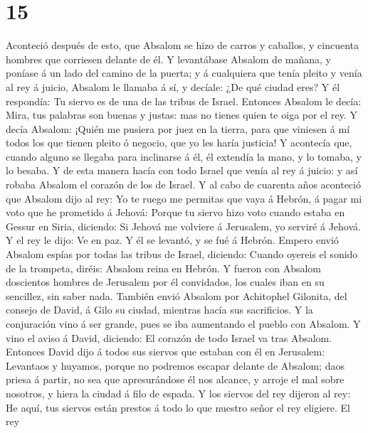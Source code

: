 \hypertarget{section-14}{%
\section{15}\label{section-14}}

 Aconteció después de esto, que Absalom se hizo de carros
y caballos, y cincuenta hombres que corriesen delante de él.
 Y levantábase Absalom de mañana, y poníase á un lado del
camino de la puerta; y á cualquiera que tenía pleito y venía al rey á
juicio, Absalom le llamaba á sí, y decíale: ¿De qué ciudad eres? Y él
respondía: Tu siervo es de una de las tribus de Israel. 
Entonces Absalom le decía: Mira, tus palabras son buenas y justas: mas
no tienes quien te oiga por el rey.  Y decía Absalom:
¡Quién me pusiera por juez en la tierra, para que viniesen á mí todos
los que tienen pleito ó negocio, que yo les haría justicia!
 Y acontecía que, cuando alguno se llegaba para inclinarse
á él, él extendía la mano, y lo tomaba, y lo besaba.  Y de
esta manera hacía con todo Israel que venía al rey á juicio: y así
robaba Absalom el corazón de los de Israel.  Y al cabo de
cuarenta años aconteció que Absalom dijo al rey: Yo te ruego me permitas
que vaya á Hebrón, á pagar mi voto que he prometido á Jehová:
 Porque tu siervo hizo voto cuando estaba en Gessur en
Siria, diciendo: Si Jehová me volviere á Jerusalem, yo serviré á Jehová.
 Y el rey le dijo: Ve en paz. Y él se levantó, y se fué á
Hebrón.  Empero envió Absalom espías por todas las tribus
de Israel, diciendo: Cuando oyereis el sonido de la trompeta, diréis:
Absalom reina en Hebrón.  Y fueron con Absalom doscientos
hombres de Jerusalem por él convidados, los cuales iban en su sencillez,
sin saber nada.  También envió Absalom por Achitophel
Gilonita, del consejo de David, á Gilo su ciudad, mientras hacía sus
sacrificios. Y la conjuración vino á ser grande, pues se iba aumentando
el pueblo con Absalom.  Y vino el aviso á David,
diciendo: El corazón de todo Israel va tras Absalom. 
Entonces David dijo á todos sus siervos que estaban con él en Jerusalem:
Levantaos y huyamos, porque no podremos escapar delante de Absalom; daos
priesa á partir, no sea que apresurándose él nos alcance, y arroje el
mal sobre nosotros, y hiera la ciudad á filo de espada. 
Y los siervos del rey dijeron al rey: He aquí, tus siervos están prestos
á todo lo que nuestro señor el rey eligiere.  El rey
